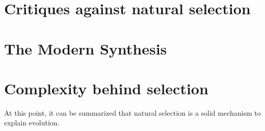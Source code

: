 \section{Critiques against natural selection}

\section{The Modern Synthesis}

\section{Complexity behind selection}
At this point, it can be summarized that natural selection is a solid mechanism to explain evolution.
